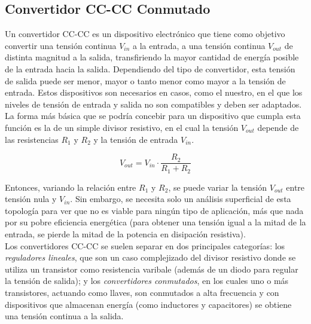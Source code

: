 \subsection{Convertidor CC-CC Conmutado}

Un convertidor CC-CC es un dispositivo electrónico que tiene como objetivo convertir una tensión continua $V_{in}$ a la entrada, a una tensión continua $V_{out}$ de distinta magnitud a la salida, transfiriendo la mayor cantidad de energía posible de la entrada hacia la salida. Dependiendo del tipo de convertidor, esta tensión de salida puede ser menor, mayor o tanto menor como mayor a la tensión de entrada. Estos dispositivos son necesarios en casos, como el nuestro, en el que los niveles de tensión de entrada y salida no son compatibles y deben ser adaptados.\\

La forma más básica que se podría concebir para un dispositivo que cumpla esta función es la de un simple divisor resistivo, en el cual la tensión $V_{out}$ depende de las resistencias $R_1$ y $R_2$ y la tensión de entrada $V_{in}$.

\begin{equation*}
    V_{out} = V_{in}\cdot\frac{R_2}{R_1+R_2}
\end{equation*}

Entonces, variando la relación entre $R_1$ y $R_2$, se puede variar la tensión $V_{out}$ entre tensión nula y $V_{in}$. Sin embargo, se necesita solo un análisis superficial de esta topología para ver que no es viable para ningún tipo de aplicación, más que nada por su pobre eficiencia energética (para obtener una tensión igual a la mitad de la entrada, se pierde la mitad de la potencia en disipación resistiva).\\

Los convertidores CC-CC se suelen separar en dos principales categorías: los \textit{reguladores lineales}, que son un caso complejizado del divisor resistivo donde se utiliza un transistor como resistencia varibale (además de un diodo para regular la tensión de salida); y los \textit{convertidores conmutados}, en los cuales uno o más transistores, actuando como llaves, son conmutados a alta frecuencia y con dispositivos que almacenan energía (como inductores y capacitores) se obtiene una tensión continua a la salida.\\

